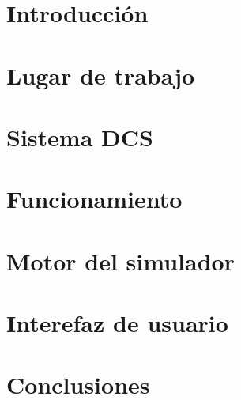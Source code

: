 \documentclass[a4paper,12pt]{article}
\begin{document}
\tableofcontents

\pagebreak

\section{Introducción}
\section{Lugar de trabajo}
\section{Sistema DCS}
\section{Funcionamiento}
\section{Motor del simulador}
\section{Interefaz de usuario}
\section{Conclusiones}
\end{document}
